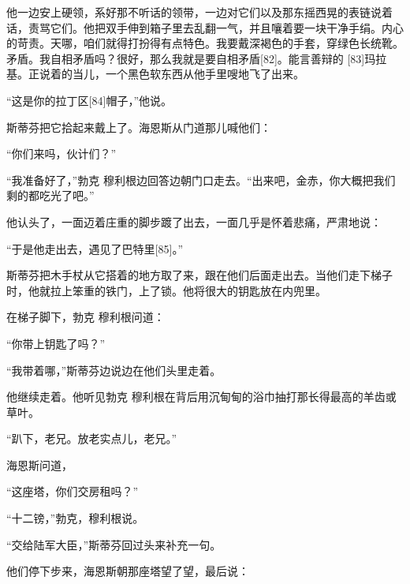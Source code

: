 \documentclass{article}
\begin{document}
他一边安上硬领，系好那不听话的领带，一边对它们以及那东摇西晃的表链说着话，责骂它们。他把双手伸到箱子里去乱翻一气，并且嚷着要一块干净手绢。内心的苛责。天哪，咱们就得打扮得有点特色。我要戴深褐色的手套，穿绿色长统靴。矛盾。我自相矛盾吗？很好，那么我就是要自相矛盾[82]。能言善辩的 [83]玛拉基。正说着的当儿，一个黑色软东西从他手里嗖地飞了出来。



“这是你的拉丁区[84]帽子，”他说。



斯蒂芬把它拾起来戴上了。海恩斯从门道那儿喊他们：



“你们来吗，伙计们？”



“我准备好了，”勃克 \cdot 穆利根边回答边朝门口走去。“出来吧，金赤，你大概把我们剩的都吃光了吧。”



他认头了，一面迈着庄重的脚步踱了出去，一面几乎是怀着悲痛，严肃地说：



“于是他走出去，遇见了巴特里[85]。”



斯蒂芬把木手杖从它搭着的地方取了来，跟在他们后面走出去。当他们走下梯子时，他就拉上笨重的铁门，上了锁。他将很大的钥匙放在内兜里。



在梯子脚下，勃克 \cdot 穆利根问道：



“你带上钥匙了吗？”



“我带着哪，”斯蒂芬边说边在他们头里走着。



他继续走着。他听见勃克 \cdot 穆利根在背后用沉甸甸的浴巾抽打那长得最高的羊齿或草叶。



“趴下，老兄。放老实点儿，老兄。”



海恩斯问道，



“这座塔，你们交房租吗？”



“十二镑，”勃克，穆利根说。



“交给陆军大臣，”斯蒂芬回过头来补充一句。



他们停下步来，海恩斯朝那座塔望了望，最后说：
\end{document}
